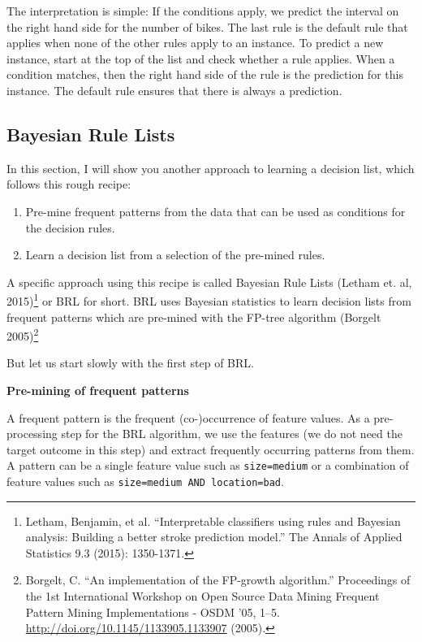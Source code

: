 \documentclass[12pt,]{krantz}
\providecommand{\tightlist}{%
  \setlength{\itemsep}{0pt}\setlength{\parskip}{0pt}}
\begin{document}
The interpretation is simple: If the conditions apply, we predict the
interval on the right hand side for the number of bikes. The last rule
is the default rule that applies when none of the other rules apply to
an instance. To predict a new instance, start at the top of the list and
check whether a rule applies. When a condition matches, then the right
hand side of the rule is the prediction for this instance. The default
rule ensures that there is always a prediction.

\subsection{Bayesian Rule Lists}\label{bayesian-rule-lists}

In this section, I will show you another approach to learning a decision
list, which follows this rough recipe:

\begin{enumerate}
\def\labelenumi{\arabic{enumi}.}
\tightlist
\item
  Pre-mine frequent patterns from the data that can be used as
  conditions for the decision rules.
\item
  Learn a decision list from a selection of the pre-mined rules.
\end{enumerate}

A specific approach using this recipe is called Bayesian Rule Lists
(Letham et. al, 2015)\footnote{Letham, Benjamin, et al. ``Interpretable
  classifiers using rules and Bayesian analysis: Building a better
  stroke prediction model.'' The Annals of Applied Statistics 9.3
  (2015): 1350-1371.} or BRL for short. BRL uses Bayesian statistics to
learn decision lists from frequent patterns which are pre-mined with the
FP-tree algorithm (Borgelt 2005)\footnote{Borgelt, C. ``An
  implementation of the FP-growth algorithm.'' Proceedings of the 1st
  International Workshop on Open Source Data Mining Frequent Pattern
  Mining Implementations - OSDM '05, 1--5.
  \url{http://doi.org/10.1145/1133905.1133907} (2005).}

But let us start slowly with the first step of BRL.

\textbf{Pre-mining of frequent patterns}

A frequent pattern is the frequent (co-)occurrence of feature values. As
a pre-processing step for the BRL algorithm, we use the features (we do
not need the target outcome in this step) and extract frequently
occurring patterns from them. A pattern can be a single feature value
such as \texttt{size=medium} or a combination of feature values such as
\texttt{size=medium\ AND\ location=bad}.
\end{document}

